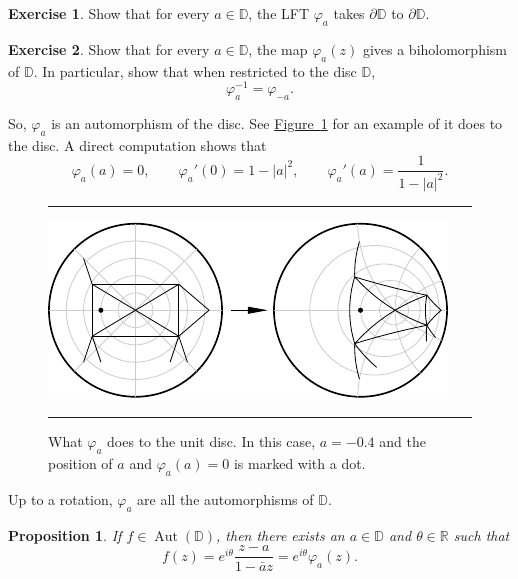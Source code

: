 \documentclass[12pt,openany]{book}
\newcommand{\sabs}[1]{\lvert {#1} \rvert}
\newcommand{\R}{{\mathbb{R}}}
\newcommand{\D}{{\mathbb{D}}}
\theoremstyle{plain}
\newtheorem{prop}[thm]{Proposition}
\theoremstyle{remark}
\theoremstyle{definition}
\newenvironment{exbox}{%
    \def\FrameCommand{\vrule width 1pt \relax\hspace {10pt}}%
    \MakeFramed {\advance \hsize -\width \FrameRestore }%
}{%
    \endMakeFramed
}
\newenvironment{myfig}{%
\begin{figure}[h!t]
\noindent\rule{\textwidth}{0.4pt}\vspace{12pt}\par\centering}%
{\par\noindent\rule{\textwidth}{0.4pt}
\end{figure}}
\theoremstyle{exercise}
\newtheorem{exercise}{Exercise}[section]
\theoremstyle{example}
\newcommand{\figureref}[1]{\hyperref[#1]{Figure~\ref*{#1}}}
\begin{document}
\begin{exbox}
\begin{exercise}
Show that for every $a \in \D$, the LFT $\varphi_a$ takes
$\partial \D$ to $\partial \D$.
\end{exercise}

\begin{exercise}
Show that for every $a \in \D$, the map $\varphi_a(z)$ gives a biholomorphism
of $\D$.
In particular, show that when restricted to the disc $\D$,
\begin{equation*}
\varphi_a^{-1} = \varphi_{-a} .
\end{equation*}
\end{exercise}
\end{exbox}

So, $\varphi_a$ is an automorphism of the disc.
See \figureref{fig:varphiplot} for an example of it does to the disc.
A direct computation shows that
\begin{equation*}
\varphi_a(a) = 0, \qquad
\varphi_a'(0) = 1 - \sabs{a}^2, \qquad
\varphi_a'(a) = \frac{1}{1 - \sabs{a}^2} .
\end{equation*}
\begin{myfig}
\includegraphics{figures/varphiplot}
\caption{What $\varphi_a$ does to the unit disc.   In this case,
$a=-0.4$ and the position of $a$ and $\varphi_a(a)=0$ is marked with a dot.%
\label{fig:varphiplot}}
\end{myfig}

Up to a rotation, $\varphi_a$ are all the automorphisms of $\D$.

\begin{prop}
If $f \in \operatorname{Aut}(\D)$, then there exists an $a \in \D$
and $\theta \in \R$ such that
\begin{equation*}
f(z) = e^{i\theta} \frac{z-a}{1-\bar{a}z} = e^{i\theta} \varphi_a(z).
\end{equation*}
\end{prop}
\end{document}
